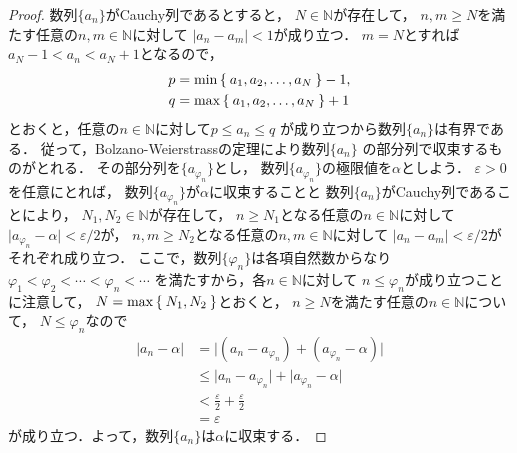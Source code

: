 \begin{proof}
       数列$\{ a_n \}$がCauchy列であるとすると，
       $N \in \mathbb{N}$が存在して，
       $n ,m \geq N$を満たす任意の$n ,  m \in \mathbb{N}$に対して
       $\lvert a_n - a_m \rvert <1$が成り立つ．
       $m=N$とすれば$a_N - 1 < a_n < a_N +1$となるので，
       \begin{align*}
         p & = \min \Set{ a_1 ,  a_2 ,  \ldots ,  a_N } -1 , \\
         q & = \max \Set{ a_1 ,  a_2 ,  \ldots ,  a_N } +1 
       \end{align*}
       とおくと，任意の$n \in \mathbb{N}$に対して$p \leq a_n \leq q$
       が成り立つから数列$\{ a_ n \}$は有界である．
       従って，Bolzano-Weierstrassの定理により数列$\{ a_n \}$
       の部分列で収束するものがとれる．
       その部分列を$\{ a_ {\varphi_n} \}$とし，
       数列$\{ a_{\varphi _n} \}$の極限値を$\alpha$としよう．
       $\varepsilon >0$を任意にとれば，
       数列$\{ a_{\varphi_n} \}$が$\alpha$に収束することと
       数列$\{ a_n \}$がCauchy列であることにより，
       $N_1 ,  N_2 \in \mathbb{N}$が存在して，
       $n \geq N_1$となる任意の$n \in \mathbb{N}$に対して
       $\lvert a_{\varphi _n} - \alpha \rvert < \varepsilon /2$が，
       $n ,m \geq N_2$となる任意の$n ,  m \in \mathbb{N}$に対して
       $\lvert a_n - a_m \rvert < \varepsilon /2 $がそれぞれ成り立つ．
       ここで，数列$\{ \varphi _n \}$は各項自然数からなり
       $\varphi _1 < \varphi _2 < \cdots < \varphi _n < \cdots$
       を満たすから，各$n \in \mathbb{N}$に対して
       $n \leq \varphi_n $が成り立つことに注意して，
       $N = \max \Set{ N_1 ,  N_2 }$とおくと，
       $n \geq N$を満たす任意の$n \in \mathbb{N}$について，
       $N \leq \varphi _n $なので
       \begin{align*}
         \lvert a_n - \alpha \rvert 
         & = \lvert (a_n - a_{\varphi_n}) + (a_{\varphi _n} - \alpha) \rvert \\
         & \leq \lvert a_n - a_{ \varphi _n} \rvert
         + \lvert a_{\varphi_n} - \alpha \rvert \\
         & < \frac{\varepsilon}{2} + \frac{\varepsilon}{2} \\
         & = \varepsilon
       \end{align*}
       が成り立つ．よって，数列$\{ a_n \}$は$\alpha$に収束する．
     \end{proof}

